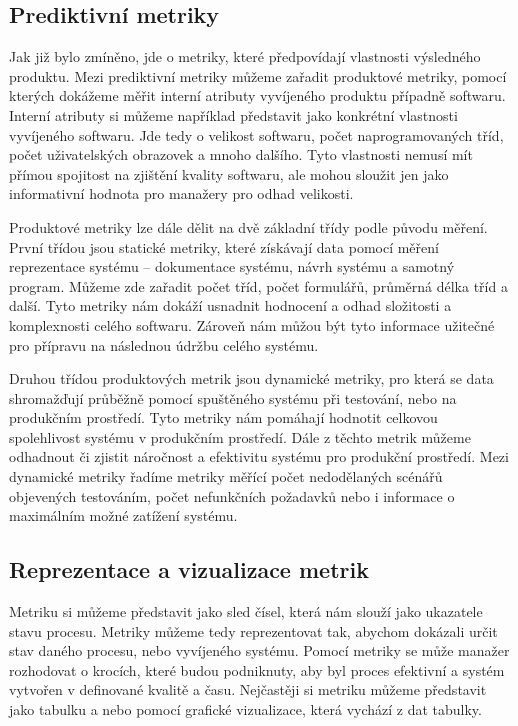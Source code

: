 \documentclass[czech,master,public,dept460,male,cpdeclaration,oneside]{diploma}
\begin{document}
\subsection{Prediktivní metriky}
Jak již bylo zmíněno, jde o metriky, které předpovídají vlastnosti výsledného produktu. Mezi prediktivní metriky můžeme zařadit produktové metriky, pomocí kterých dokážeme měřit interní atributy vyvíjeného produktu případně softwaru. Interní atributy si můžeme například představit jako konkrétní vlastnosti vyvíjeného softwaru. Jde tedy o velikost softwaru, počet naprogramovaných tříd, počet uživatelských obrazovek a mnoho dalšího. Tyto vlastnosti nemusí mít přímou spojitost na zjištění kvality softwaru, ale mohou sloužit jen jako informativní hodnota pro manažery pro odhad velikosti.

Produktové metriky lze dále dělit na dvě základní třídy podle původu měření. První třídou jsou statické metriky, které získávají data pomocí měření reprezentace systému -- dokumentace systému, návrh systému a samotný program. Můžeme zde zařadit počet tříd, počet formulářů, průměrná délka tříd a další. Tyto metriky nám dokáží usnadnit hodnocení a odhad složitosti a komplexnosti celého softwaru. Zároveň nám můžou být tyto informace užitečné pro přípravu na následnou údržbu celého systému.

Druhou třídou produktových metrik jsou dynamické metriky, pro která se data shromažďují průběžně pomocí spuštěného systému při testování, nebo na produkčním prostředí. Tyto metriky nám pomáhají hodnotit celkovou spolehlivost systému v produkčním prostředí. Dále z těchto metrik můžeme odhadnout či zjistit náročnost a efektivitu systému pro produkční prostředí. Mezi dynamické metriky řadíme metriky měřící počet nedodělaných scénářů objevených testováním, počet nefunkčních požadavků nebo i informace o maximálním možné zatížení systému.

\subsection{Reprezentace a vizualizace metrik}
\label{sec:visualisation}
Metriku si můžeme představit jako sled čísel, která nám slouží jako ukazatele stavu procesu. Metriky můžeme tedy reprezentovat tak, abychom dokázali určit stav daného procesu, nebo vyvíjeného systému. Pomocí metriky se může manažer rozhodovat o krocích, které budou podniknuty, aby byl proces efektivní a systém vytvořen v definované kvalitě a času. Nejčastěji si metriku můžeme představit jako tabulku a nebo pomocí grafické vizualizace, která vychází z dat tabulky.
\end{document}
